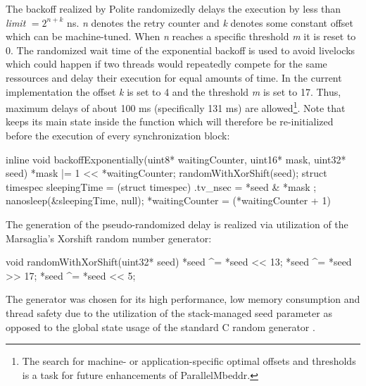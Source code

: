The backoff realized by Polite randomizedly delays the execution  by less than \textit{limit} $ = 2^{n+k}$ ns\cite{AdvancedContentionManagement}. \textit{n} denotes the retry counter and \textit{k} denotes some constant offset which can be machine-tuned. When \textit{n} reaches a specific threshold \textit{m} it is reset to 0. The randomized wait time of the exponential backoff is used to avoid livelocks which could happen if two threads would repeatedly compete for the same ressources and delay their execution for equal amounts of time. In the current implementation  the offset \textit{k} is set to 4 and the threshold \textit{m} is set to 17. Thus, maximum delays of about 100 ms (specifically 131 ms) are allowed\footnote{The search for machine- or application-specific optimal offsets and thresholds is a task for future enhancements of ParallelMbeddr.}. Note that  keeps its main state inside the  function which will therefore be re-initialized before the execution of every synchronization block:
\begin{ccode}
inline void backoffExponentially(uint8* waitingCounter, uint16* mask, uint32* seed) { 
  *mask |= 1 << *waitingCounter; 
  randomWithXorShift(seed); 
  struct timespec sleepingTime = (struct timespec){ .tv_nsec = *seed & *mask }; 
  nanosleep(&sleepingTime, null); 
  *waitingCounter = (*waitingCounter + 1) %
}
\end{ccode}

The generation of the pseudo-randomized delay is realized via utilization of the Marsaglia's Xorshift random number generator\cite{XorshiftRngs}:
\begin{ccode}
void randomWithXorShift(uint32* seed) { 
  *seed ^= *seed << 13; 
  *seed ^= *seed >> 17; 
  *seed ^= *seed << 5; 
}
\end{ccode}
The generator was chosen for its high performance, low memory consumption and thread safety due to the utilization of the stack-managed seed parameter as opposed to the global state usage of the standard C random generator .